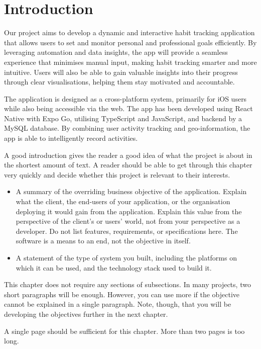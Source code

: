 \chapter{Introduction}
\label{chap:introduction}
Our project aims to develop a dynamic and interactive habit tracking application that allows users to set and monitor personal and professional goals efficiently. By leveraging automation and data insights, the app will provide a seamless experience that minimises manual input, making habit tracking smarter and more intuitive. Users will also be able to gain valuable insights into their progress through clear visualisations, helping them stay motivated and accountable.

The application is designed as a cross-platform system, primarily for iOS users while also being accessible via the web. The app has been developed using React Native with Expo Go, utilising TypeScript and JavaScript, and backend by a MySQL database. By combining user activity tracking and geo-information, the app is able to intelligently record activities.


\begin{expectations}
A good introduction gives the reader a good idea of what the project is about in the shortest amount of text.  A reader should be able to get through this chapter very quickly and decide whether this project is relevant to their interests.
\begin{itemize}
\item A summary of the overriding business objective of the application.  Explain what the client, the end-users of your application, or the organisation deploying it would gain from the application.  Explain this value from the perspective of the client's or users' world, not from your perspective as a developer.   Do not list features, requirements, or specifications here.  The software is a means to an end, not the objective in itself.
\item A statement of the type of system you built, including the platforms on which it can be used, and the technology stack used to build it.
\end{itemize}
This chapter does not require any sections of subsections.  In many projects, two short paragraphs will be enough.  However, you can use more if the objective cannot be explained in a single paragraph.  Note, though, that you will be developing the objectives further in the next chapter.
\end{expectations}

\begin{length}
A single page should be sufficient for this chapter.  More than two pages is too long.
\end{length}

